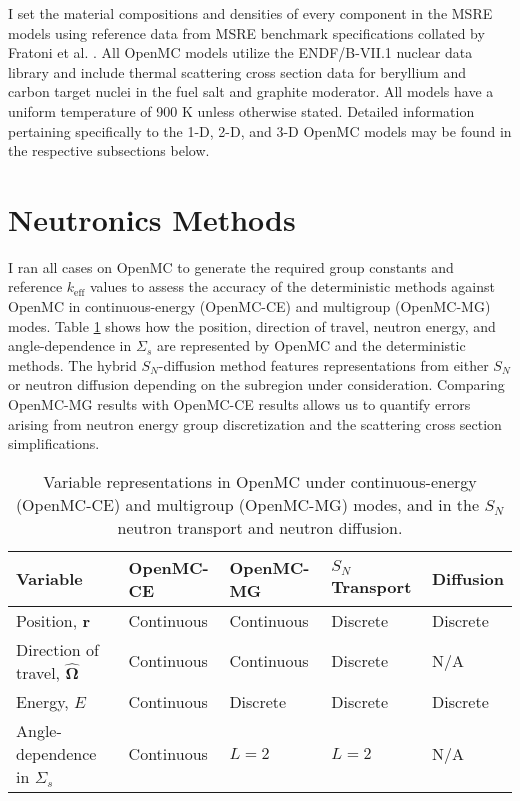 I set the material compositions and densities of every component in the \gls{MSRE} models using
reference data from \gls{MSRE} benchmark specifications collated by Fratoni et al.
\cite{fratoni_molten_2020}. All OpenMC models utilize the ENDF/B-VII.1 nuclear data library
\cite{chadwick_endf/b-vii.1_2011} and include thermal scattering cross section data for beryllium
and carbon target nuclei in the fuel salt and graphite moderator. All models have a uniform
temperature of 900 K unless otherwise stated. Detailed information pertaining specifically to the
1-D, 2-D, and 3-D OpenMC models may be found in the respective subsections below.

\section{Neutronics Methods}

I ran all cases on OpenMC to generate the required group constants and reference $k_\text{eff}$
values to assess the accuracy of the deterministic methods against OpenMC in continuous-energy
(OpenMC-CE) and multigroup (OpenMC-MG) modes. Table \ref{table:var} shows how the
position, direction of travel, neutron energy, and angle-dependence in $\Sigma_s$ are represented
by OpenMC and the deterministic methods. The hybrid $S_N$-diffusion method features representations
from either $S_N$ or neutron diffusion depending on the subregion under consideration.
Comparing OpenMC-MG results with OpenMC-CE results allows us
to quantify errors arising from neutron energy group discretization and the scattering cross
section simplifications.

\begin{table}[htb!]
  \centering
  \footnotesize
  \caption{Variable representations in OpenMC under continuous-energy (OpenMC-CE) and multigroup
  (OpenMC-MG) modes, and in the $S_N$ neutron transport and neutron diffusion.}
  \begin{tabular}{l l l l l}
    \toprule
    Variable & OpenMC-CE & OpenMC-MG & $S_N$ Transport & Diffusion \\
    \midrule
    Position, $\bm{r}$ & Continuous & Continuous & Discrete & Discrete \\
    Direction of travel, $\bm{\hat{\Omega}}$ & Continuous & Continuous & Discrete & N/A \\
    Energy, $E$ & Continuous & Discrete & Discrete & Discrete \\
    Angle-dependence in $\Sigma_s$ & Continuous & $L=2$ & $L=2$ & N/A \\
    \bottomrule
  \end{tabular}
  \label{table:var}
\end{table}

